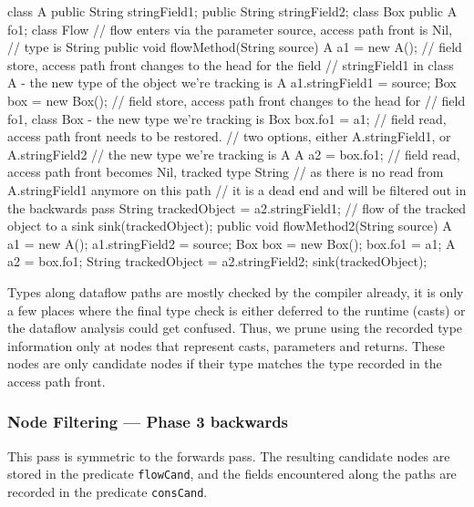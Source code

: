 \begin{listing}[H]
    \begin{javacode}
class A {
    public String stringField1;
    public String stringField2;
}
class Box {
    public A fo1;
}
class Flow {
    // flow enters via the parameter source, access path front is Nil,
    // type is String
    public void flowMethod(String source) {
        A a1 = new A();
        // field store, access path front changes to the head for the field 
        // stringField1 in class A - the new type of the object we're tracking is A
        a1.stringField1 = source;
        Box box = new Box();
        // field store, access path front changes to the head for
        // field fo1, class Box - the new type we're tracking is Box
        box.fo1 = a1;
        // field read, access path front needs to be restored.
        // two options, either A.stringField1, or A.stringField2
        // the new type we're tracking is A
        A a2 = box.fo1;
        // field read, access path front becomes Nil, tracked type String
        // as there is no read from A.stringField1 anymore on this path 
        // it is a dead end and will be filtered out in the backwards pass
        String trackedObject = a2.stringField1;
        // flow of the tracked object to a sink
        sink(trackedObject);
    }         
    public void flowMethod2(String source) {
        A a1 = new A();
        a1.stringField2 = source;
        Box box = new Box();
        box.fo1 = a1;
        A a2 = box.fo1;
        String trackedObject = a2.stringField2;
        sink(trackedObject);
    }
}
    \end{javacode}
\end{listing}

Types along dataflow paths are mostly checked by the compiler already, it is 
only a few places where the final type check is either deferred to the runtime 
(casts) or the dataflow analysis could get confused.
Thus, we prune using the recorded type information only at nodes that represent 
casts, parameters and returns.
These nodes are only candidate nodes if their type 
matches the type recorded in the access path front.

\subsubsection*{Node Filtering --- Phase 3 backwards}
This pass is symmetric to the forwards pass.
The resulting candidate nodes are stored in the predicate \texttt{flowCand},
and the fields encountered along the paths are recorded in
the predicate \texttt{consCand}.

